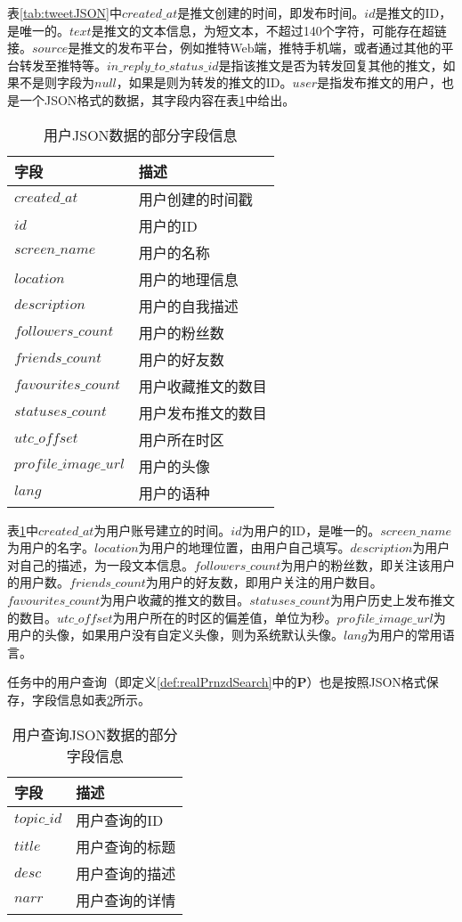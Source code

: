 表\ref{tab:tweetJSON}中$created\_at$是推文创建的时间，即发布时间。$id$是推文的ID，是唯一的。$text$是推文的文本信息，为短文本，不超过140个字符，可能存在超链接。$source$是推文的发布平台，例如推特Web端，推特手机端，或者通过其他的平台转发至推特等。$in\_reply\_to\_status\_id$是指该推文是否为转发回复其他的推文，如果不是则字段为$null$，如果是则为转发的推文的ID。$user$是指发布推文的用户，也是一个JSON格式的数据，其字段内容在表\ref{tab:userJSON}中给出。
\begin{table}[!htbp]
\centering
\caption{用户JSON数据的部分字段信息}
\begin{tabular}{|p{4cm}|p{7cm}|}
\hline
\textbf{字段} & \textbf{描述} \\
\hline
$created\_at$ & 用户创建的时间戳\\
\hline
$id$ & 用户的ID\\
\hline
$screen\_name$ & 用户的名称\\
\hline
$location$ & 用户的地理信息\\
\hline
$description$ & 用户的自我描述\\
\hline
$followers\_count$ & 用户的粉丝数\\
\hline
$friends\_count$ & 用户的好友数\\
\hline
$favourites\_count$ & 用户收藏推文的数目\\
\hline
$statuses\_count$ & 用户发布推文的数目\\
\hline
$utc\_offset$ & 用户所在时区\\
\hline
$profile\_image\_url$ & 用户的头像\\
\hline
$lang$ & 用户的语种\\
\hline
\end{tabular}
\label{tab:userJSON}
\end{table}

表\ref{tab:userJSON}中$created\_at$为用户账号建立的时间。$id$为用户的ID，是唯一的。$screen\_name$为用户的名字。$location$为用户的地理位置，由用户自己填写。$description$为用户对自己的描述，为一段文本信息。$followers\_count$为用户的粉丝数，即关注该用户的用户数。$friends\_count$为用户的好友数，即用户关注的用户数目。$favourites\_count$为用户收藏的推文的数目。$statuses\_count$为用户历史上发布推文的数目。$utc\_offset$为用户所在的时区的偏差值，单位为秒。$profile\_image\_url$为用户的头像，如果用户没有自定义头像，则为系统默认头像。$lang$为用户的常用语言。

任务中的用户查询（即定义\ref{def:realPrnzdSearch}中的\textbf{P}）也是按照JSON格式保存，字段信息如表\ref{tab:queryJSON}所示。
\begin{table}[!htbp]
\centering
\caption{用户查询JSON数据的部分字段信息}
\begin{tabular}{|p{4cm}|p{7cm}|}
\hline
\textbf{字段} & \textbf{描述} \\
\hline
$topic\_id$ & 用户查询的ID\\
\hline
$title$ & 用户查询的标题\\
\hline
$desc$ & 用户查询的描述\\
\hline
$narr$ & 用户查询的详情\\
\hline
\end{tabular}
\label{tab:queryJSON}
\end{table}

